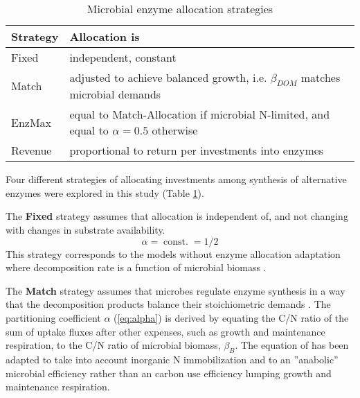 \begin{table}[t]
\caption{Microbial enzyme allocation strategies \label{tab:AllocStrategies}}
\vskip4mm
\centering
\begin{tabular}{lp{6.5cm}}
\hline
Strategy &  Allocation is \\
\hline
Fixed & independent, constant \\
Match & adjusted to achieve balanced growth, i.e. $\beta_{DOM}$ matches
microbial demands  \\
EnzMax & equal to Match-Allocation if microbial N-limited, and
equal to $\alpha=0.5$ otherwise
\\
Revenue & proportional to return per investments into enzymes \\
\hline
\end{tabular}
\end{table}

Four different strategies of
allocating investments among synthesis of alternative enzymes were explored in this study (Table
\ref{tab:AllocStrategies}).

The \textbf{Fixed} strategy assumes that allocation is independent of,
and not changing with changes in substrate availability.
\begin{equation} 
\label{eq:allocFixed}
\alpha = \operatorname{const.} = 1/2
\end{equation}
This strategy corresponds to the models without enzyme allocation adaptation
where decomposition rate is a function of microbial biomass \citep{Wutzler08}.
 
The \textbf{Match} strategy assumes that microbes regulate enzyme synthesis in a
way that the decomposition products balance their stoichiometric demands
\citep{Moorhead12}. The partitioning coefficient $\alpha$ (\ref{eq:alpha}) is
derived by equating the C/N ratio of the sum of uptake fluxes after
other expenses, such as growth and maintenance respiration, to the
C/N ratio of microbial biomass, $\beta_B$. The equation of \citep{Moorhead12}
has been adapted to take into account inorganic N immobilization and to an
''anabolic'' microbial efficiency rather than an carbon use efficiency lumping
growth and maintenance respiration.

